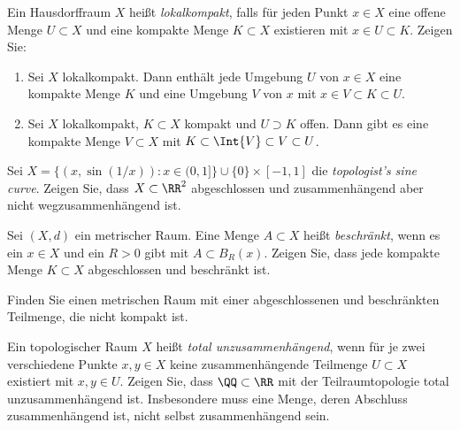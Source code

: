 

\setcounter{Sheet}{4}



\maketitle
\begin{exercise}
Ein Hausdorffraum $X$ heißt \emph{lokalkompakt}, falls für jeden Punkt $x\in X$ eine offene Menge $U\subset X$ und eine kompakte Menge $K\subset X$ existieren mit $x\in U\subset K$. Zeigen Sie:
\begin{enumerate}
\item Sei $X$ lokalkompakt. Dann enthält jede Umgebung $U$ von $x\in X$ eine kompakte Menge $K$ und eine Umgebung $V$ von $x$ mit $x\in V\subset K\subset U$.
\item Sei $X$ lokalkompakt, $K\subset X$ kompakt und $U\supset K$ offen. Dann gibt es eine kompakte Menge $V\subset X$ mit $K\subset \Int{V}\subset V\subset U$.
\end{enumerate}
\end{exercise}

\begin{exercise}
Sei $X = \{ (x,\sin(1/x)) : x\in (0,1]\} \cup \{0\}\times[-1,1]$ die \emph{topologist's sine curve}. Zeigen Sie, dass $X\subset \RR^2$ abgeschlossen und zusammenhängend aber nicht wegzusammenhängend ist.
\end{exercise}

\begin{exercise}
Sei $(X,d)$ ein metrischer Raum. Eine Menge $A\subset X$ heißt \emph{beschränkt}, wenn es ein $x\in X$ und ein $R >0$ gibt mit $A\subset B_R(x)$. Zeigen Sie, dass jede kompakte Menge $K\subset X$ abgeschlossen und beschränkt ist.

Finden Sie einen metrischen Raum mit einer abgeschlossenen und beschränkten Teilmenge, die nicht kompakt ist.
\end{exercise}

\begin{exercise}
Ein topologischer Raum $X$ heißt \emph{total unzusammenhängend}, wenn für je zwei verschiedene Punkte $x,y\in X$ keine zusammenhängende Teilmenge $U\subset X$ existiert mit $x,y\in U$. Zeigen Sie, dass $\QQ\subset\RR$ mit der Teilraumtopologie total unzusammenhängend ist. {\footnotesize Insbesondere muss eine Menge, deren Abschluss zusammenhängend ist, nicht selbst zusammenhängend sein.}
\end{exercise}

